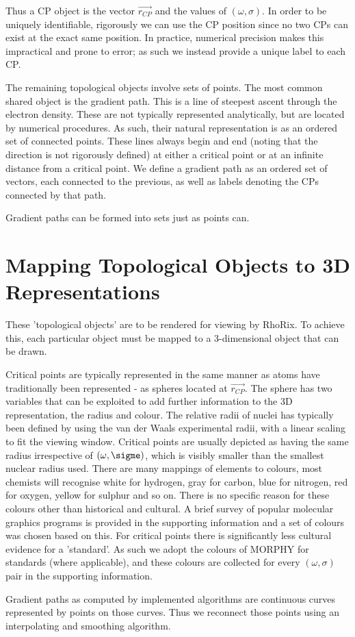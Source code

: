 \documentclass{tufte-handout}
\newcommand{\programName}{RhoRix}
\begin{document}
Thus a CP object is the vector $\vec{r_{CP}}$ and the values of $(\omega,\sigma)$. In order to be uniquely identifiable, rigorously we can use the CP position since no two CPs can exist at the exact same position. In practice, numerical precision makes this impractical and prone to error; as such we instead provide a unique label to each CP.
\par{}
The remaining topological objects involve sets of points. The most common shared object is the gradient path. This is a line of steepest ascent through the electron density. These are not typically represented analytically, but are located by numerical procedures. As such, their natural representation is as an ordered set of connected points. These lines always begin and end (noting that the direction is not rigorously defined) at either a critical point or at an infinite distance from a critical point. We define a gradient path as an ordered set of vectors, each connected to the previous, as well as labels denoting the CPs connected by that path.

Gradient paths can be formed into sets just as points can.

\section{Mapping Topological Objects to 3D Representations}
These 'topological objects' are to be rendered for viewing by \programName{}. To achieve this, each particular object must be mapped to a 3-dimensional object that can be drawn.

Critical points are typically represented in the same manner as atoms have traditionally been represented - as spheres located at $\vec{r_{CP}}$. The sphere has two variables that can be exploited to add further information to the 3D representation, the radius and colour. The relative radii of nuclei has typically been defined by using the van der Waals experimental radii, with a linear scaling to fit the viewing window. Critical points are usually depicted as having the same radius irrespective of $(\omega,\sigme)$, which is visibly smaller than the smallest nuclear radius used. There are many mappings of elements to colours, most chemists will recognise white for hydrogen, gray for carbon, blue for nitrogen, red for oxygen, yellow for sulphur and so on. There is no specific reason for these colours other than historical and cultural. A brief survey of popular molecular graphics programs is provided in the supporting information and a set of colours was chosen based on this.
For critical points there is significantly less cultural evidence for a 'standard'. As such we adopt the colours of MORPHY for standards (where applicable), and these colours are collected for every $(\omega,\sigma)$ pair in the supporting information.

Gradient paths as computed by implemented algorithms are continuous curves represented by points on those curves. Thus we reconnect those points using an interpolating and smoothing algorithm.
\end{document}
